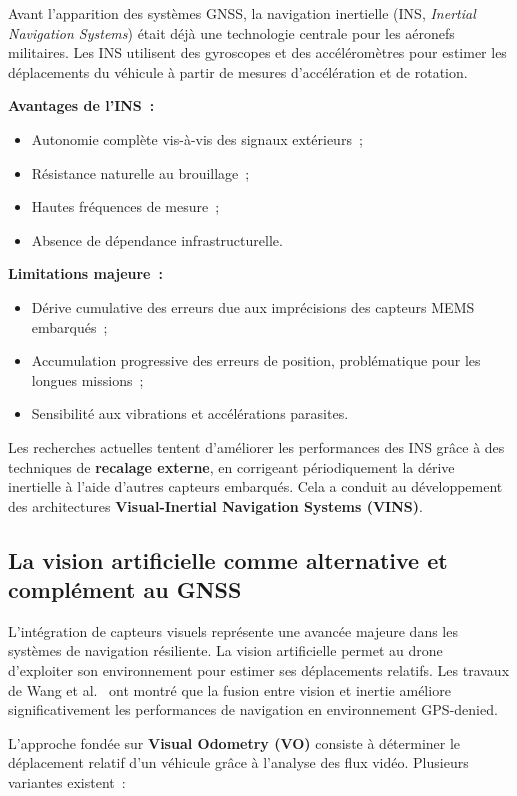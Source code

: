 \documentclass[12pt, a4paper, twoside, openright]{report}
\begin{document}
Avant l'apparition des systèmes GNSS, la navigation inertielle (INS, \textit{Inertial Navigation Systems}) était déjà une technologie centrale pour les aéronefs militaires. Les INS utilisent des gyroscopes et des accéléromètres pour estimer les déplacements du véhicule à partir de mesures d'accélération et de rotation.

\textbf{Avantages de l'INS~:}
\begin{itemize}
    \item Autonomie complète vis-à-vis des signaux extérieurs~;
    \item Résistance naturelle au brouillage~;
    \item Hautes fréquences de mesure~;
    \item Absence de dépendance infrastructurelle.
\end{itemize}

\textbf{Limitations majeure~:}
\begin{itemize}
    \item Dérive cumulative des erreurs due aux imprécisions des capteurs MEMS embarqués~;
    \item Accumulation progressive des erreurs de position, problématique pour les longues missions~;
    \item Sensibilité aux vibrations et accélérations parasites.
\end{itemize}

Les recherches actuelles tentent d'améliorer les performances des INS grâce à des techniques de \textbf{recalage externe}, en corrigeant périodiquement la dérive inertielle à l'aide d'autres capteurs embarqués. Cela a conduit au développement des architectures \textbf{Visual-Inertial Navigation Systems (VINS)}.

\subsection{La vision artificielle comme alternative et complément au GNSS}

L'intégration de capteurs visuels représente une avancée majeure dans les systèmes de navigation résiliente. La vision artificielle permet au drone d'exploiter son environnement pour estimer ses déplacements relatifs. Les travaux de Wang et al.~\cite{wang2013visual} ont montré que la fusion entre vision et inertie améliore significativement les performances de navigation en environnement GPS-denied.

L'approche fondée sur \textbf{Visual Odometry (VO)} consiste à déterminer le déplacement relatif d'un véhicule grâce à l'analyse des flux vidéo. Plusieurs variantes existent~:
\end{document}
